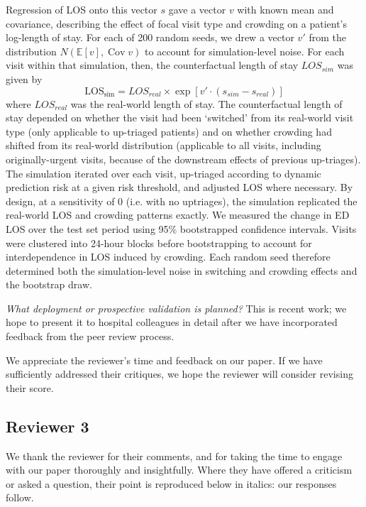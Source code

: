 Regression of LOS onto this vector \(s\) gave a vector \(v\) with known mean and covariance, describing the effect of focal visit type and crowding on a patient's log-length of stay. For each of 200 random seeds, we drew a vector \(v'\) from the distribution \(N(\mathbb{E}[v], \operatorname{Cov}{v})\) to account for simulation-level noise. For each visit within that simulation, then, the counterfactual length of stay \(LOS_{sim}\) was given by 
\[\text{LOS}_\text{sim} = LOS_{real}  \times \exp[v' \cdot (s_{sim}-s_{real} )]\]
where \(LOS_{real}\) was the real-world length of stay.  The counterfactual length of stay depended on whether the visit had been `switched' from its real-world visit type (only applicable to up-triaged patients) and on whether crowding had shifted from its real-world distribution (applicable to all visits, including originally-urgent visits, because of the downstream effects of previous up-triages). The simulation iterated over each visit, up-triaged according to dynamic prediction risk at a given risk threshold, and adjusted LOS where necessary. By design, at a sensitivity of 0 (i.e. with no uptriages), the simulation replicated the real-world LOS and crowding patterns exactly. We measured the change in ED LOS over the test set period using 95\% bootstrapped confidence intervals. Visits were clustered into 24-hour blocks before bootstrapping to account for interdependence in LOS induced by crowding. Each random seed therefore determined both the simulation-level noise in switching and crowding effects and the bootstrap draw.

\textit{
     What deployment or prospective validation is planned?}
This is recent work; we hope to present it to hospital colleagues in detail after we have incorporated feedback from the peer review process.



We appreciate the reviewer’s time and feedback on our paper. If we have sufficiently addressed their critiques, we hope the reviewer will consider revising their score.


\subsection{Reviewer 3}

We thank the reviewer for their comments, and for taking the time to engage with our paper thoroughly and insightfully. Where they have offered a criticism or asked a question, their point is reproduced below in italics: our responses follow.



